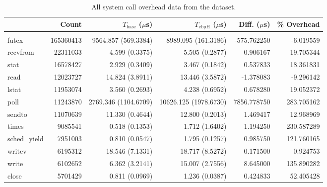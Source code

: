 \begin{longtable}{>{\ttfamily}lrrrrr}
\caption{All system call overhead data from the  dataset.}\label{tab:homeostasis_3day_full}\\
\toprule
\multicolumn{1}{l}{System Call} &      Count & $T_\text{base}$ ($\mu$s) & $T_\text{ebpH}$ ($\mu$s) &  Diff. ($\mu$s) &  \% Overhead \\
\midrule
\endfirsthead
\endhead
\midrule
\multicolumn{6}{r}{{Continued on next page}} \\
\midrule
\endfoot

\bottomrule
\endlastfoot
                          futex &  165360413 &      9564.857 (569.3384) &      8989.095 (161.3186) &     -575.762250 &    -6.019559 \\
                       recvfrom &   22311033 &           4.599 (0.3375) &           5.505 (0.2877) &        0.906167 &    19.705344 \\
                           stat &   16578427 &           2.929 (0.3409) &           3.467 (0.1842) &        0.537833 &    18.361831 \\
                           read &   12023727 &          14.824 (3.8911) &          13.446 (3.5872) &       -1.378083 &    -9.296142 \\
                          lstat &   11953074 &           3.560 (0.2693) &           4.238 (0.6952) &        0.678280 &    19.052372 \\
                           poll &   11243870 &     2769.346 (1104.6709) &    10626.125 (1978.6730) &     7856.778750 &   283.705162 \\
                         sendto &   11070639 &          11.330 (0.4644) &          12.800 (0.2013) &        1.469417 &    12.968969 \\
                          times &    9085541 &           0.518 (0.1353) &           1.712 (1.6402) &        1.194250 &   230.587289 \\
                   sched\_yield &    7951003 &           0.810 (0.0547) &           1.795 (0.1257) &        0.985750 &   121.760165 \\
                         writev &    6195312 &          18.546 (7.1331) &          18.717 (8.5272) &        0.171500 &     0.924753 \\
                          write &    6102652 &           6.362 (3.2141) &          15.007 (2.7556) &        8.645000 &   135.890282 \\
                          close &    5701429 &           0.811 (0.0969) &           1.236 (0.0387) &        0.424833 &    52.405428 \\

\end{longtable}
